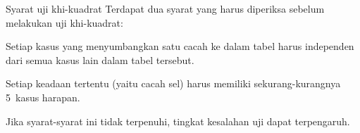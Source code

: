 \begin{onebox}{Syarat uji khi-kuadrat}
  Terdapat dua syarat yang harus diperiksa sebelum
  melakukan uji khi-kuadrat:\vspace{-1mm}
  \begin{description}
  \setlength{\itemsep}{0mm}
  \item[Independensi.] Setiap kasus yang menyumbangkan satu cacah ke
      dalam tabel harus independen dari semua kasus lain dalam
      tabel tersebut.
  \item[Ukuran sampel/distribusi.] Setiap keadaan tertentu
      (yaitu cacah sel) harus memiliki sekurang-kurangnya 5~kasus harapan.
  \end{description}
  Jika syarat-syarat ini tidak terpenuhi, tingkat kesalahan uji dapat terpengaruh.
\end{onebox}



